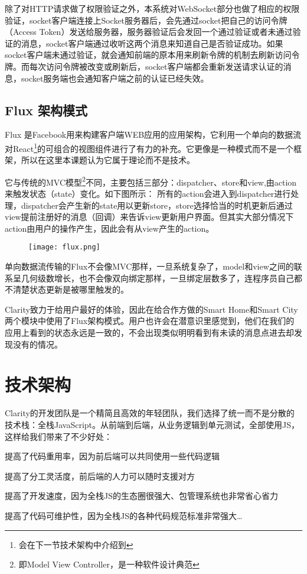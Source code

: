 除了对HTTP请求做了权限验证之外，本系统对WebSocket部分也做了相应的权限验证，socket客户端连接上Socket服务器后，会先通过socket把自己的访问令牌（Access Token）发送给服务器，服务器验证后会发回一个通过验证或者未通过验证的消息，socket客户端通过收听这两个消息来知道自己是否验证成功。如果socket客户端未通过验证，就会通知前端的原本用来刷新令牌的机制去刷新访问令牌。而每次访问令牌被改变或刷新后，socket客户端都会重新发送请求认证的消息，socket服务端也会通知客户端之前的认证已经失效。

\subsection{Flux 架构模式}
Flux 是Facebook用来构建客户端WEB应用的应用架构，它利用一个单向的数据流对React\footnote{会在下一节技术架构中介绍到}的可组合的视图组件进行了有力的补充。它更像是一种模式而不是一个框架，所以在这里本课题认为它属于理论而不是技术。

它与传统的MVC模型\footnote{即Model View Controller，是一种软件设计典范}不同，主要包括三部分：dispatcher、store和view,由action来触发状态（state）变化。如下图所示： 所有的action会进入到dispatcher进行处理，dispatcher会产生新的state用以更新store，store选择恰当的时机更新后通过view提前注册好的消息（回调）来告诉view更新用户界面。但其实大部分情况下action由用户的操作产生，因此会有从view产生的action。

\begin{figure}[!htp]
 \centering
 \texttt{[image: flux.png]}
\end{figure}

单向数据流传输的Flux不会像MVC那样，一旦系统复杂了，model和view之间的联系呈几何级数增长，也不会像双向绑定那样，一旦绑定层数多了，连程序员自己都不清楚状态更新是被哪里触发的。

Clarity致力于给用户最好的体验，因此在给合作方做的Smart Home和Smart City两个模块中使用了Flux架构模式。用户也许会在潜意识里感觉到，他们在我们的应用上看到的状态永远是一致的，不会出现类似明明看到有未读的消息点进去却发现没有的情况。

\section{技术架构}
Clarity的开发团队是一个精简且高效的年轻团队，我们选择了统一而不是分散的技术栈：全栈JavaScript。从前端到后端，从业务逻辑到单元测试，全部使用JS，这样给我们带来了不少好处：
\begin{enumerate*}
  \item 提高了代码重用率，因为前后端可以共同使用一些代码逻辑
  \item 提高了分工灵活度，前后端的人力可以随时支援对方
  \item 提高了开发速度，因为全栈JS的生态圈很强大、包管理系统也非常省心省力
  \item 提高了代码可维护性，因为全栈JS的各种代码规范标准非常强大\ldots
\end{enumerate*}

